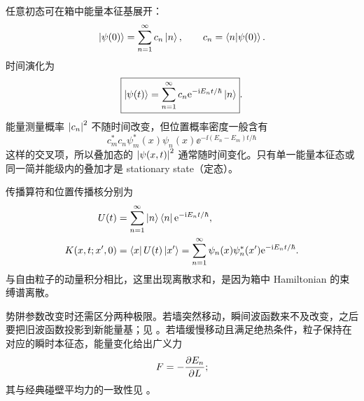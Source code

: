 任意初态可在箱中能量本征基展开：
\begin{equation}
  \left|\psi(0)\right\rangle=\sum_{n=1}^{\infty}c_n\left|n\right\rangle,
  \qquad
  c_n=\left\langle n \middle| \psi(0) \right\rangle.
  \label{eq:QM-C05-S02-general-initial-expansion}
\end{equation}
时间演化为
\begin{equation}
  \boxed{
  \left|\psi(t)\right\rangle=
  \sum_{n=1}^{\infty}
  c_n\mathrm{e}^{-\mathrm{i} E_nt/\hbar}\left|n\right\rangle}.
  \label{eq:QM-C05-S02-general-time-evolution}
\end{equation}
能量测量概率 $\left|c_n\right|^2$ 不随时间改变，但位置概率密度一般含有
\begin{equation}
  c_m^*c_n\psi_m^*(x)\psi_n(x)
  \ee^{-\ii(E_n-E_m)t/\hbar}
  \label{eq:QM-C05-S02-position-cross-terms}
\end{equation}
这样的交叉项，所以叠加态的 $\left|\psi(x,t)\right|^2$ 通常随时间变化。只有单一能量本征态或同一简并能级内的叠加才是 stationary state（定态）。

传播算符和位置传播核分别为
\begin{align}
  U(t)
  &=\sum_{n=1}^{\infty}
  \left|n\right\rangle\left\langle n\right|\mathrm{e}^{-\mathrm{i} E_nt/\hbar},
  \label{eq:QM-C05-S02-box-propagator-operator}\\
  K(x,t;x',0)
  &=\left\langle x\right|U(t)\left|x'\right\rangle
  =\sum_{n=1}^{\infty}
  \psi_n(x)\psi_n^*(x')
  \mathrm{e}^{-\mathrm{i} E_nt/\hbar}.
  \label{eq:QM-C05-S02-box-kernel}
\end{align}
与自由粒子的动量积分相比，这里出现离散求和，是因为箱中 Hamiltonian 的束缚谱离散。


势阱参数改变时还需区分两种极限。若墙突然移动，瞬间波函数来不及改变，之后要把旧波函数投影到新能量基；见
。若墙缓慢移动且满足绝热条件，粒子保持在对应的瞬时本征态，能量变化给出广义力
\begin{equation}
  F=-\frac{\partial E_n}{\partial L};
  \label{eq:QM-C05-S02-adiabatic-force}
\end{equation}
其与经典碰壁平均力的一致性见
。

